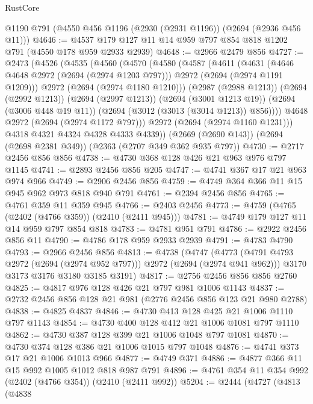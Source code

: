\begin{lexlean}{RustCore}
\begin{coremodule}
    @1190
    @791
    (@4550 @456 @1196 (@2930 (@2931 @1196)) (@2694 (@2936 @456 @11)))
@4646 := @4537 @179 @127 @11 @14 @959 @797 @854 @818 @1202 @791 (@4550 @178 @959 @2933 @2939)
@4648 := @2966 @2479 @856
@4727 := @2473
    (@4526
      (@4535
        (@4560
          (@4570
            (@4580
              (@4587
                (@4611
                  (@4631
                    (@4646 @4648 @2972 (@2694 (@2974 @1203 @797)))
                    @2972
                    (@2694 (@2974 @1191 @1209)))
                  @2972
                  (@2694 (@2974 @1180 @1210)))
                (@2987 (@2988 @1213))
                (@2694 (@2992 @1213))
                (@2694 (@2997 @1213))
                (@2694 (@3001 @1213 @19))
                (@2694 (@3006 @448 @19 @11))
                (@2694 (@3012 (@3013 (@3014 @1213)) @856))))
            @4648
            @2972
            (@2694 (@2974 @1172 @797)))
          @2972
          (@2694 (@2974 @1160 @1231)))
        @4318
        @4321
        @4324
        @4328
        @4333
        @4339))
    (@2669 (@2690 @143))
    (@2694 (@2698 @2381 @349))
    (@2363 (@2707 @349 @362 @935 @797))
@4730 := @2717 @2456 @856 @856
@4738 := @4730 @368 @128 @426 @21 @963 @976 @797 @1145
@4741 := @2893 @2456 @856 @205
@4747 := @4741 @367 @17 @21 @963 @974 @966
@4749 := @2906 @2456 @856
@4759 := @4749 @364 @366 @11 @15 @945 @962 @973 @818 @940 @791
@4761 := @2394 @2456 @856
@4765 := @4761 @359 @11 @359 @945
@4766 := @2403 @2456
@4773 := @4759 (@4765 (@2402 (@4766 @359)) (@2410 (@2411 @945)))
@4781 := @4749 @179 @127 @11 @14 @959 @797 @854 @818
@4783 := @4781 @951 @791
@4786 := @2922 @2456 @856 @11
@4790 := @4786 @178 @959 @2933 @2939
@4791 := @4783 @4790
@4793 := @2966 @2456 @856
@4813 := @4738
    (@4747
      (@4773 (@4791 @4793 @2972 (@2694 (@2974 @952 @797))) @2972 (@2694 (@2974 @941 @962)))
      @3170
      @3173
      @3176
      @3180
      @3185
      @3191)
@4817 := @2756 @2456 @856 @856 @2760
@4825 := @4817 @976 @128 @426 @21 @797 @981 @1006 @1143
@4837 := @2732 @2456 @856 @128 @21 @981 (@2776 @2456 @856 @123 @21 @980 @2788)
@4838 := @4825 @4837
@4846 := @4730 @413 @128 @425 @21 @1006 @1110 @797 @1143
@4854 := @4730 @400 @128 @412 @21 @1006 @1081 @797 @1110
@4862 := @4730 @387 @128 @399 @21 @1006 @1048 @797 @1081
@4870 := @4730 @374 @128 @386 @21 @1006 @1015 @797 @1048
@4876 := @4741 @373 @17 @21 @1006 @1013 @966
@4877 := @4749 @371
@4886 := @4877 @366 @11 @15 @992 @1005 @1012 @818 @987 @791
@4896 := @4761 @354 @11 @354 @992 (@2402 (@4766 @354)) (@2410 (@2411 @992))
@5204 := @2444
    (@4727
      (@4813
        (@4838

\end{coremodule}
\end{lexlean}

